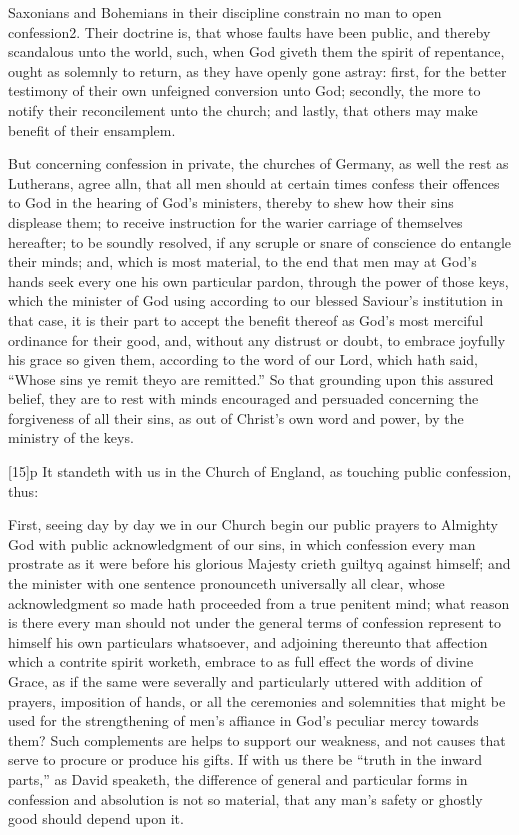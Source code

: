 Saxonians and Bohemians in their discipline constrain no man to open confession2. Their doctrine is, that whose faults have been public, and thereby scandalous unto the world, such, when God giveth them the spirit of repentance, ought as solemnly to return, as they have openly gone astray: first, for the better testimony of their own unfeigned conversion unto God; secondly, the more to notify their reconcilement unto the church; and lastly, that others may make benefit of their ensamplem.

But concerning confession in private, the churches of Germany, as well the rest as Lutherans, agree alln, that all  men should at certain times confess their offences to God in the hearing of God’s ministers, thereby to shew how their sins displease them; to receive instruction for the warier carriage of themselves hereafter; to be soundly resolved, if any scruple or snare of conscience do entangle their minds; and, which is most material, to the end that men may at God’s hands seek every one his own particular pardon, through the power of those keys, which the minister of God using according to our blessed Saviour’s institution in that case, it is their part to accept the benefit thereof as God’s most merciful ordinance for their good, and, without any distrust or doubt, to embrace joyfully his grace so given them, according to the word of our Lord, which hath said, “Whose sins ye remit theyo are remitted.” So that grounding upon this assured belief, they are to rest with minds encouraged and persuaded concerning the forgiveness of all their sins, as out of Christ’s own word and power, by the ministry of the keys.

[15]p It standeth with us in the Church of England, as touching public confession, thus:

First, seeing day by day we in our Church begin our public prayers to Almighty God with public acknowledgment of our sins, in which confession every man prostrate as it were before his glorious Majesty crieth guiltyq against himself; and the minister with one sentence pronounceth universally all clear, whose acknowledgment so made hath proceeded from a true penitent mind; what reason is there every man should not under the general terms of confession represent to himself  his own particulars whatsoever, and adjoining thereunto that affection which a contrite spirit worketh, embrace to as full effect the words of divine Grace, as if the same were severally and particularly uttered with addition of prayers, imposition of hands, or all the ceremonies and solemnities that might be used for the strengthening of men’s affiance in God’s peculiar mercy towards them? Such complements are helps to support our weakness, and not causes that serve to procure or produce his gifts. If with us there be “truth in the inward parts,” as David speaketh, the difference of general and particular forms in confession and absolution is not so material, that any man’s safety or ghostly good should depend upon it.

